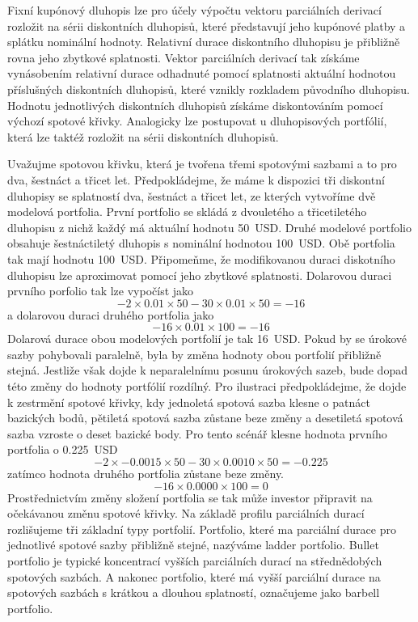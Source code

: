 \documentclass[a4paper]{book}
\begin{document}
Fixní kupónový dluhopis lze pro účely výpočtu vektoru parciálních derivací rozložit na sérii diskontních dluhopisů, které představují jeho kupónové platby a splátku nominální hodnoty. Relativní durace diskontního dluhopisu je přibližně rovna jeho zbytkové splatnosti. Vektor parciálních derivací tak získáme vynásobením relativní durace odhadnuté pomocí splatnosti aktuální hodnotou příslušných diskontních dluhopisů, které vznikly rozkladem původního dluhopisu. Hodnotu jednotlivých diskontních dluhopisů získáme diskontováním pomocí výchozí spotové křivky. Analogicky lze postupovat u dluhopisových portfólií, která lze taktéž rozložit na sérii diskontních dluhopisů.

Uvažujme spotovou křivku, která je tvořena třemi spotovými sazbami a to pro dva, šestnáct a třicet let. Předpokládejme, že máme k dispozici tři diskontní dluhopisy se splatností dva, šestnáct a třicet let, ze kterých vytvoříme dvě modelová portfolia. První portfolio se skládá z dvouletého a třicetiletého dluhopisu z nichž každý má aktuální hodnotu 50~USD. Druhé modelové portfolio obsahuje šestnáctiletý dluhopis s nominální hodnotou 100~USD. Obě portfolia tak mají hodnotu 100~USD. Připomeňme, že modifikovanou duraci diskotního dluhopisu lze aproximovat pomocí jeho zbytkové splatnosti. Dolarovou duraci prvního porfolio tak lze vypočíst jako
\begin{equation*}
-2 \times 0.01 \times 50 - 30 \times 0.01 \times 50 = -16
\end{equation*}
a dolarovou duraci druhého portfolia jako
\begin{equation*}
-16 \times 0.01 \times 100 = -16
\end{equation*}
Dolarová durace obou modelových portfolií je tak 16~USD. Pokud by se úrokové sazby pohybovali paralelně, byla by změna hodnoty obou portfolií přibližně stejná. Jestliže však dojde k neparalelnímu posunu úrokových sazeb, bude dopad této změny do hodnoty portfólií rozdílný. Pro ilustraci předpokládejme, že dojde k zestrmění spotové křivky, kdy jednoletá spotová sazba klesne o patnáct bazických bodů, pětiletá spotová sazba zůstane beze změny a desetiletá spotová sazba vzroste o deset bazické body. Pro tento scénář klesne hodnota prvního portfolia o 0.225~USD
\begin{equation*}
-2 \times -0.0015 \times 50 - 30 \times 0.0010 \times 50 = -0.225
\end{equation*}
zatímco hodnota druhého portfolia zůstane beze změny.
\begin{equation*}
-16 \times 0.0000 \times 100 = 0
\end{equation*}
Prostřednictvím změny složení portfolia se tak může investor připravit na očekávanou změnu spotové křivky. Na základě profilu parciálních durací rozlišujeme tři základní typy portfolií. Portfolio, které ma parciální durace pro jednotlivé spotové sazby přibližně stejné, nazýváme ladder portfolio. Bullet portfolio je typické koncentrací vyšších parciálních durací na střednědobých spotových sazbách. A nakonec portfolio, které má vyšší parciální durace na spotových sazbách s krátkou a dlouhou splatností, označujeme jako barbell portfolio.
\end{document}
